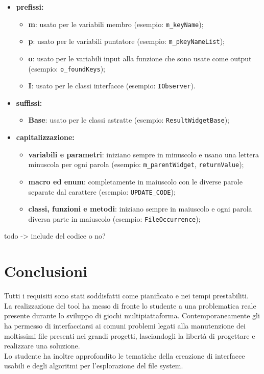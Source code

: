 	\begin{itemize}
		\item \textbf{prefissi:}
		\begin{itemize}
			\item \textbf{m}: usato per le variabili membro (esempio: \texttt{m\_keyName});
			\item \textbf{p}: usato per le variabili puntatore (esempio: \texttt{m\_pkeyNameList});
			\item \textbf{o}: usato per le variabili input alla funzione che sono usate come output (esempio: \texttt{o\_foundKeys});
			\item \textbf{I}: usato per le classi interfacce (esempio: \texttt{IObserver}).
		\end{itemize}
		\item \textbf{suffissi:}
		\begin{itemize}
			\item \textbf{Base}: usato per le classi astratte (esempio: \texttt{ResultWidgetBase});
		\end{itemize}
		\item \textbf{capitalizzazione:}
		\begin{itemize}
			\item \textbf{variabili e parametri}: iniziano sempre in minuscolo e usano una lettera minuscola per ogni parola (esempio: \texttt{m\_parentWidget}, \texttt{returnValue});
			\item \textbf{macro ed enum}: completamente in maiuscolo con le diverse parole separate dal carattere \sq{\_} (esempio: \texttt{UPDATE\_CODE});
			\item \textbf{classi, funzioni e metodi}: iniziano sempre in maiuscolo e ogni parola diversa parte in maiuscolo (esempio: \texttt{FileOccurrence});
		\end{itemize}
	\end{itemize}
	
	todo -> include del codice o no?
	
\section{Conclusioni}
	Tutti i requisiti sono stati soddisfatti come pianificato e nei tempi prestabiliti.\\
	La realizzazione del tool ha messo di fronte lo studente a una problematica reale presente durante lo sviluppo di giochi multipiattaforma. Contemporaneamente gli ha permesso di interfacciarsi ai comuni problemi legati alla manutenzione dei moltissimi file presenti nei grandi progetti, lasciandogli la libertà di progettare e realizzare una soluzione.\\
	Lo studente ha inoltre approfondito le tematiche della creazione di interfacce usabili e degli algoritmi per l'esplorazione del file system.